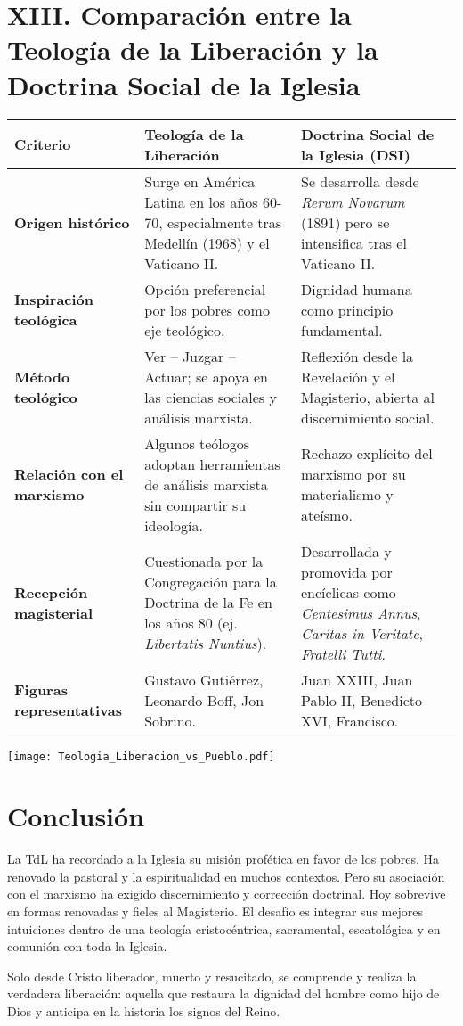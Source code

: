 \documentclass[12pt]{article}
\begin{document}
\section*{XIII. Comparación entre la Teología de la Liberación y la Doctrina Social de la Iglesia}
\renewcommand{\arraystretch}{1.5}
\begin{tabularx}{\textwidth}{|>{\bfseries}m{4cm}|X|X|}
\hline
\textbf{Criterio} & \textbf{Teología de la Liberación} & \textbf{Doctrina Social de la Iglesia (DSI)} \\
\hline
Origen histórico & Surge en América Latina en los años 60-70, especialmente tras Medellín (1968) y el Vaticano II. & Se desarrolla desde \textit{Rerum Novarum} (1891) pero se intensifica tras el Vaticano II. \\
\hline
Inspiración teológica & Opción preferencial por los pobres como eje teológico. & Dignidad humana como principio fundamental. \\
\hline
Método teológico & Ver – Juzgar – Actuar; se apoya en las ciencias sociales y análisis marxista. & Reflexión desde la Revelación y el Magisterio, abierta al discernimiento social. \\
\hline
Relación con el marxismo & Algunos teólogos adoptan herramientas de análisis marxista sin compartir su ideología. & Rechazo explícito del marxismo por su materialismo y ateísmo. \\
\hline
Recepción magisterial & Cuestionada por la Congregación para la Doctrina de la Fe en los años 80 (ej. \textit{Libertatis Nuntius}). & Desarrollada y promovida por encíclicas como \textit{Centesimus Annus}, \textit{Caritas in Veritate}, \textit{Fratelli Tutti}. \\
\hline
Figuras representativas & Gustavo Gutiérrez, Leonardo Boff, Jon Sobrino. & Juan XXIII, Juan Pablo II, Benedicto XVI, Francisco. \\
\hline
\end{tabularx}

\texttt{[image: Teologia\_Liberacion\_vs\_Pueblo.pdf]}

\section*{Conclusión}
La TdL ha recordado a la Iglesia su misión profética en favor de los pobres. Ha renovado la pastoral y la espiritualidad en muchos contextos. Pero su asociación con el marxismo ha exigido discernimiento y corrección doctrinal. Hoy sobrevive en formas renovadas y fieles al Magisterio. El desafío es integrar sus mejores intuiciones dentro de una teología cristocéntrica, sacramental, escatológica y en comunión con toda la Iglesia.

Solo desde Cristo liberador, muerto y resucitado, se comprende y realiza la verdadera liberación: aquella que restaura la dignidad del hombre como hijo de Dios y anticipa en la historia los signos del Reino.
\end{document}

